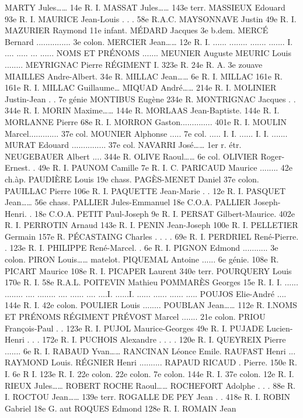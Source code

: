 \documentclass[a4paper,11pt]{book}
\begin{document}
MARTY Jules……
14e R. I.
MASSAT Jules……
143e terr.
MASSIEUX Edouard
93e R. I.
MAURICE Jean-Louis . . . 58e R.A.C.
MAYSONNAVE Justin
49e R. I.
MAZURIER Raymond
11e infant.
MÉDARD Jacques
3e b.dem.
MERCÉ Bernard ............... 3e colon.
MERCIER Jean……
12e R. I.
......
........
.......
.......
I.
....
.....
...
......
NOMS ET PRÉNOMS
.......
MEUNIER Auguste
MEURIC Louis ........
MEYRIGNAC Pierre
RÉGIMENT
I.
323e R.
24e R. A.
3e zouave
MIAILLES Andre-Albert. 34e R.
MILLAC Jean……
6e R. I.
MILLAC
161e R.
161e
R. I.
MILLAC Guillaume…
MIQUAD André……
214e R. I.
MOLINIER Justin-Jean . . 7e génie
MONTIBUS Eugène
234e R.
MONTRIGNAC Jacques . . 344e R. I.
MORIN Maxime……
144e R.
MORLAAS Jean-Baptiste. 144e R. I.
MORLANNE Pierre
68e R. I.
MORRON Gaston..............
401e R. I.
MOULIN Marcel.............
37e col.
MOUNIER Alphonse ..... 7e col.
.....
I.
I.
......
I.
I.
.......
MURAT Edouard ............... 37e col.
NAVARRI José……
1er r. étr.
NEUGEBAUER Albert ....
344e R.
OLIVE Raoul……
6e col.
OLIVIER Roger-Ernest. . 49e R. I.
PAUNOM Camille
7e R. I. C.
PARICAUD Maurice ........ 42e ch.àp.
PAUDIÈRE Louis
19e chass.
PAGÈS-MENET Daniel
37e colon.
PAUILLAC Pierre
106e R. I.
PAQUETTE Jean-Marie . . 12e R. I.
PASQUET Jean……
56e chass.
PALLIER Jules-Emmanuel 18e C.O.A.
PALLIER Joseph-Henri. . 18e C.O.A.
PETIT Paul-Joseph
9e R. I.
PERSAT Gilbert-Maurice. 402e R. I.
PERROTIN Arnaud
143e R. I.
PENIN Jean-Joseph
100e R. I.
PELLETIER Germain
157e R.
PÉCASTAING Charles . . . . 69e R. I.
PERDRIEL René-Pierre. . 123e R. I.
PHILIPPE René-Marcel. . 6e R. I.
PIGNON Edmond ........... 3e colon.
PIRON Louis……
matelot.
PIQUEMAL Antoine ...... 6e génie.
108e R.
PICART Maurice
108e
R. I.
PICAPER Laurent
340e terr.
POURQUERY Louis
170e R. I.
58e R.A.L.
POITEVIN Mathieu
POMMARÈS Georges
15e R. I.
I.
......
........
....
........
....
......
....
....I.
......I.
......
......
......
.....
POUJOS Elie-André .... 144e R. I.
42e colon.
POULIER Louis ........
POUBLAN Jean……
112e R. I.NOMS ET PRÉNOMS
RÉGIMENT
PRÉVOST Marcel ....... 21e colon.
PRIOU François-Paul . . 123e R. I.
PUJOL Maurice-Georges 49e R. I.
PUJADE Lucien-Henri . . . 172e R. I.
PUCHOIS Alexandre . . . . 120e R. I.
QUEYREIX Pierre
....... 6e R. I.
RABAUD Yvan……
RANCINAN
Léonce
Emile.
RAUFAST Henri
...
RAYMOND Louis.
RÉGNIER Henri ..........
RAPAUD
RICAUD
.
Pierre.
150e R. I.
6e R I.
123e R. I.
22e colon.
22e colon.
7e colon.
144e R. I.
37e colon.
12e R. I.
RIEUX Jules……
ROBERT
ROCHE Raoul……
ROCHEFORT Adolphe . . . 88e R. I.
ROCTOU Jean……
139e terr.
ROGALLE DE PEY Jean . . 418e R. I.
ROBIN Gabriel
18e G. aut
ROQUES Edmond
128e R. I.
ROMAIN Jean
\end{document}

